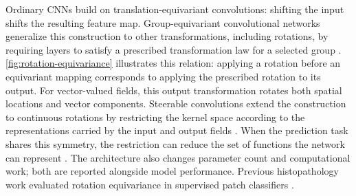 \documentclass[conference,a4paper]{IEEEtran}
\begin{document}
Ordinary CNNs build on translation-equivariant convolutions: shifting the
input shifts the resulting feature map. Group-equivariant convolutional
networks generalize this construction
to other transformations, including rotations, by requiring layers to satisfy
a prescribed transformation law for a selected group \cite{cohen_group_2016}.
\autoref{fig:rotation-equivariance} illustrates this relation: applying a
rotation before an equivariant mapping corresponds to applying the prescribed
rotation to its output. For vector-valued fields, this output transformation
rotates both spatial locations and vector components.
Steerable convolutions extend the construction to continuous rotations by
restricting the kernel space according to the representations carried by the
input and output fields \cite{cohen_steerable_2017,weiler_general_2019}.
When the prediction task shares this symmetry, the restriction can reduce
the set of functions the network can represent \cite{elesedy_provably_2021}.
The architecture also changes parameter count and computational work; both
are reported alongside model performance. Previous histopathology work
evaluated rotation equivariance in supervised patch classifiers
\cite{veeling_rotation_2018,graham_dense_2020}.
\end{document}
